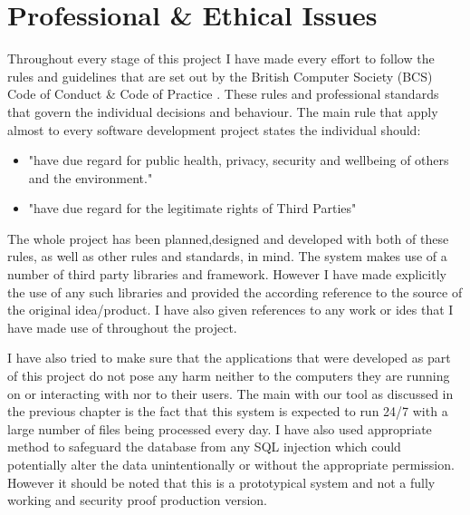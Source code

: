 \chapter{Professional \& Ethical Issues}
Throughout every stage of this project I have made every effort to follow the rules and guidelines that are set out by the British Computer Society (BCS) Code of Conduct \& Code of Practice \cite{bcsCodeOfConduct}. These rules and professional standards that govern the individual decisions and behaviour. The main rule that apply almost to every software development project states the individual should:
\begin{itemize}
	\item "have due regard for public health, privacy, security and wellbeing of others and
the environment."
	\item "have due regard for the legitimate rights of Third Parties"
\end{itemize}

The whole project has been planned,designed and developed with both of these rules, as well as other rules and standards, in mind. The system makes use of a number of third party libraries and framework. However I have made explicitly the use of any such libraries and provided the according reference to the source of the original idea/product. I have also given references to any work or ides that I have made use of throughout the project.

I have also tried to make sure that the applications that were developed as part of this project do not pose any harm neither to the computers they are running on or interacting with nor to their users. The main with our tool as discussed in the previous chapter is the fact that this system is expected to run 24/7 with a large number of files being processed every day. I have also used appropriate method to safeguard the database from any SQL injection \cite{Su2006} which could potentially alter the data unintentionally or without the appropriate permission. However it should be noted that this is a prototypical system and not a fully working and security proof production version.